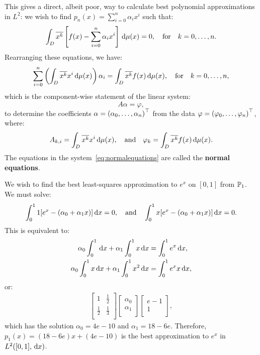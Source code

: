 This gives a direct, albeit poor, way to calculate best polynomial approximations in $L^2$: we wish to find $p_n(x) = \sum_{i=0}^n \alpha_i x^i$ such that:
\begin{equation}
\int_D \conj{x^k}\br[f(x)-\sum_{i=0}^n \alpha_i x^i]\ud\mu(x) = 0,\quad{\rm for}\quad k=0,\ldots,n.
\end{equation}
Rearranging these equations, we have:
\begin{equation}
\sum_{i=0}^n\left(\int_D\conj{x^k}x^i\ud\mu(x)\right)\alpha_i = \int_D \conj{x^k}f(x)\ud\mu(x),\quad{\rm for}\quad k=0,\ldots,n,
\end{equation}
which is the component-wise statement of the linear system:
\begin{equation}\label{eq:normalequations}
A\alpha = \varphi,
\end{equation}
to determine the coefficients $\alpha = \pr(\alpha_0,\ldots,\alpha_n)^\top$ from the data $\varphi = \pr(\varphi_0,\ldots,\varphi_n)^\top$, where:
\begin{equation}
A_{k,i} = \int_D \conj{x^k}x^i\ud\mu(x),\quad{\rm and}\quad \varphi_k = \int_D \conj{x^k}f(x)\ud\mu(x).
\end{equation}
The equations in the system~\eqref{eq:normalequations} are called the {\bf normal equations}.

\begin{example}
We wish to find the best least-squares approximation to $e^x$ on $[0,1]$ from $\P_1$. We must solve:
\[
\int_0^1 1[e^x -(\alpha_0+\alpha_1x)]\ud x = 0,\quad{\rm and}\quad \int_0^1 x[e^x -(\alpha_0+\alpha_1x)]\ud x = 0.
\]
This is equivalent to:
\begin{align*}
\alpha_0\int_0^1\ud x + \alpha_1\int_0^1x\ud x & = \int_0^1 e^x\ud x,\\
\alpha_0\int_0^1x\ud x + \alpha_1\int_0^1x^2\ud x & = \int_0^1 e^xx\ud x,
\end{align*}
or:
\begin{align*}
\begin{bmatrix}
1 & \frac{1}{2}\\
\frac{1}{2} & \frac{1}{3}\\
\end{bmatrix}
\begin{bmatrix}
\alpha_0\\\alpha_1\\
\end{bmatrix}
\begin{bmatrix}
e-1\\1\\
\end{bmatrix},
\end{align*}
which has the solution $\alpha_0 = 4e-10$ and $\alpha_1 = 18-6e$. Therefore, $p_1(x) = (18-6e)x + (4e-10)$ is the best approximation to $e^x$ in $L^2([0,1],\ud x)$.
\end{example}

